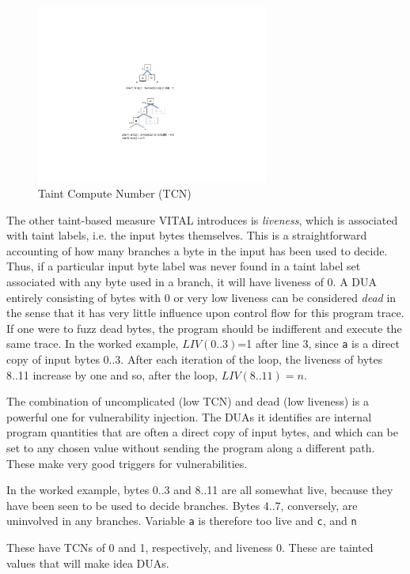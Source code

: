 \begin{figure}
\centering
\includegraphics[width=3in]{tcn.pdf}
\caption{Taint Compute Number (TCN)}
\label{fig:taint-compute-number}
\end{figure}

The other taint-based measure VITAL introduces is \emph{liveness}, which is associated with taint labels, i.e. the input bytes themselves.
This is a straightforward accounting of how many branches a byte in the input has been used to decide.
Thus, if a particular input byte label was never found in a taint label set associated with any byte used in a branch, it will have liveness of 0.
A DUA entirely consisting of bytes with 0 or very low liveness can be considered \emph{dead} in the sense that it has very little influence upon control flow for this program trace.
If one were to fuzz dead bytes, the program should be indifferent and execute the same trace.  
In the worked example, $LIV(0..3)$=1 after line 3, since \verb+a+ is a direct copy of input bytes 0..3.
After each iteration of the loop, the liveness of bytes 8..11 increase by one and so, after the loop, $LIV(8..11)=n$.

The combination of uncomplicated (low TCN) and dead (low liveness) is a powerful one for vulnerability injection.
The DUAs it identifies are internal program quantities that are often a direct copy of input bytes, and which can be set to any chosen value without sending the program along a different path.  
These make very good triggers for vulnerabilities.

In the worked example, bytes 0..3 and 8..11 are all somewhat live, because they have been seen to be used to decide branches.
Bytes 4..7, conversely, are uninvolved in any branches.
Variable \verb+a+ is therefore too live and \verb+c+, and \verb+n+ 

These have TCNs of 0 and 1, respectively, and liveness 0. 
These are tainted values that will make idea DUAs.


